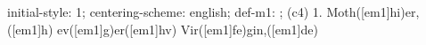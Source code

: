 initial-style: 1;
centering-scheme: english;
def-m1: \grealign;
(c4) 1. Moth([em1]hi)er,([em1]h) ev([em1]g)er([em1]hv) Vir([em1]fe)gin,([em1]de)